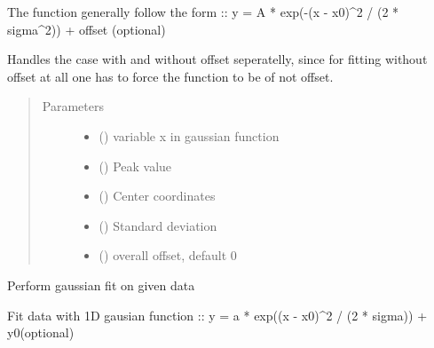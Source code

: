 \documentclass[letterpaper,10pt,english]{sphinxmanual}
\begin{document}
\begin{fulllineitems}
\begin{fulllineitems}
The function generally follow the form ::
y = A * exp(-(x - x0)\textasciicircum{}2 / (2 * sigma\textasciicircum{}2)) + offset (optional)

Handles the case with and without offset seperatelly, since for
fitting without offset at all one has to force the function to
be of not offset.
\begin{quote}\begin{description}
\item[{Parameters}] \leavevmode\begin{itemize}
\item {} 
 () \textendash{} variable x in gaussian function

\item {} 
 () \textendash{} Peak value

\item {} 
 () \textendash{} Center coordinates

\item {} 
 () \textendash{} Standard deviation

\item {} 
 () \textendash{} overall offset, default 0

\end{itemize}

\end{description}\end{quote}

\end{fulllineitems}


\begin{fulllineitems}
\label{\detokenize{scibeam.core:scibeam.core.gaussian.Gaussian.gausFit}}
Perform gaussian fit on given data

Fit data with 1D gausian function ::
y = a * exp((x - x0)\textasciicircum{}2 / (2 * sigma)) + y0(optional)


\end{fulllineitems}
\end{fulllineitems}
\end{document}
